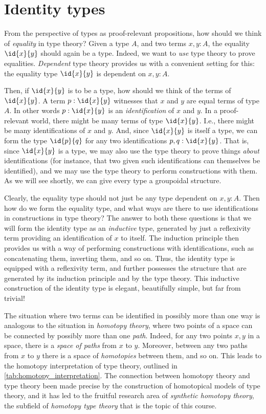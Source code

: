 \section{Identity types}\label{chap:identity}

From the perspective of types as proof-relevant propositions, how should we think of \emph{equality} in type theory? Given a type $A$, and two terms $x,y:A$, the equality $\id{x}{y}$ should again be a type. Indeed, we want to \emph{use} type theory to prove equalities. \emph{Dependent} type theory provides us with a convenient setting for this: the equality type $\id{x}{y}$ is dependent on $x,y:A$. 

Then, if $\id{x}{y}$ is to be a type, how should we think of the terms of $\id{x}{y}$. A term $p:\id{x}{y}$ witnesses that $x$ and $y$ are equal terms of type $A$. In other words $p:\id{x}{y}$ is an \emph{identification} of $x$ and $y$. In a proof-relevant world, there might be many terms of type $\id{x}{y}$. I.e., there might be many identifications of $x$ and $y$. And, since $\id{x}{y}$ is itself a type, we can form the type $\id{p}{q}$ for any two identifications $p,q:\id{x}{y}$. That is, since $\id{x}{y}$ is a type, we may also use the type theory to prove things \emph{about} identifications (for instance, that two given such identifications can themselves be identified), and we may use the type theory to perform constructions with them. As we will see shortly, we can give every type a groupoidal structure.

Clearly, the equality type should not just be any type dependent on $x,y:A$. Then how do we form the equality type, and what ways are there to use identifications in constructions in type theory? The answer to both these questions is that we will form the identity type as an \emph{inductive} type, generated by just a reflexivity term providing an identification of $x$ to itself. The induction principle then provides us with a way of performing constructions with identifications, such as concatenating them, inverting them, and so on. Thus, the identity type is equipped with a reflexivity term, and further possesses the structure that are generated by its induction principle and by the type theory. This inductive construction of the identity type is elegant, beautifully simple, but far from trivial!

The situation where two terms can be identified in possibly more than one way is analogous to the situation in \emph{homotopy theory}, where two points of a space can be connected by possibly more than one \emph{path}. Indeed, for any two points $x,y$ in a space, there is a \emph{space of paths} from $x$ to $y$. Moreover, between any two paths from $x$ to $y$ there is a space of \emph{homotopies} between them, and so on. This leads to the homotopy interpretation of type theory, outlined in \cref{tab:homotopy_interpretation}. The connection between homotopy theory and type theory been made precise by the construction of homotopical models of type theory, and it has led to the fruitful research area of \emph{synthetic homotopy theory}, the subfield of \emph{homotopy type theory} that is the topic of this course.

